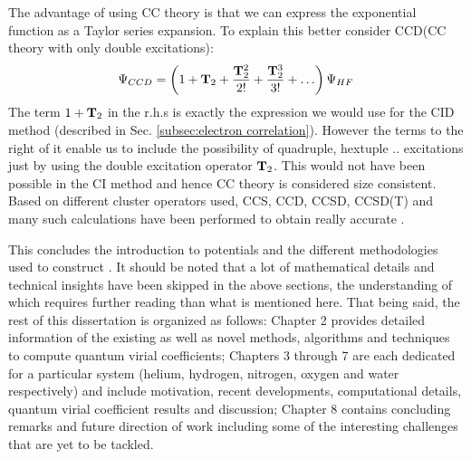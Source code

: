                The advantage of using CC theory is that we can express the exponential function as a Taylor series expansion. To explain this better consider CCD(CC theory with only double excitations):
                \begin{equation}\label{eq:ccd}
                    \Psi_{CCD} = \left( 1 + {\mathbf {T}}_2 + \frac{{\mathbf {T}}_2^2}{2!} + \frac{{\mathbf {T}}_2^3}{3!} + \ldots \right) \Psi_{HF}
                \end{equation}
                The term $1 + {\mathbf {T}}_2$ in the r.h.s is exactly the expression we would use for the CID method (described in Sec. \ref{subsec:electron correlation}). However the terms to the right of it enable us to include the possibility of quadruple, hextuple .. excitations just by using the double excitation operator ${\mathbf {T}}_2$. This would not have been possible in the CI method and hence CC theory is considered size consistent. Based on different cluster operators used, CCS, CCD, CCSD, CCSD(T) and many such calculations have been performed to obtain really accurate \PESs.

                This concludes the introduction to \abinitio{} potentials and the different methodologies used to construct \PESs. It should be noted that a lot of mathematical details and technical insights have been skipped in the above sections, the understanding of which requires further reading than what is mentioned here. That being said, the rest of this dissertation is organized as follows: Chapter 2 provides detailed information of the existing as well as novel methods, algorithms and techniques to compute quantum virial coefficients; Chapters 3 through 7 are each dedicated for a particular system (helium, hydrogen, nitrogen, oxygen and water respectively) and include motivation, recent developments, computational details, quantum virial coefficient results and discussion; Chapter 8 contains concluding remarks and future direction of work including some of the interesting challenges that are yet to be tackled.
